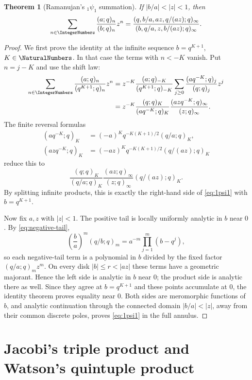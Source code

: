 \documentclass[11pt,oneside]{article}
\newtheorem{theorem}{Theorem}[section]
\theoremstyle{definition}
\begin{document}
\begin{theorem}[Ramanujan's ${}_1\psi_1$ summation]\label{thm:1psi1}
If $|b/a|<|z|<1$, then
\begin{equation}\label{eq:1psi1}
 \sum_{n\in\IntegerNumbers}\frac{(a;q)_n}{(b;q)_n}z^n
 =\frac{(q,b/a,az,q/(az);q)_\infty}
 {(b,q/a,z,b/(az);q)_\infty}.
\end{equation}
\end{theorem}

\begin{proof}
We first prove the identity at the infinite sequence $b=q^{K+1}$, $K\in\NaturalNumbers$. In that case the terms with $n<-K$ vanish. Put $n=j-K$ and use the shift law:
\begin{align*}
 \sum_{n\in\IntegerNumbers}\frac{(a;q)_n}{(q^{K+1};q)_n}z^n
 &=z^{-K}\frac{(a;q)_{-K}}{(q^{K+1};q)_{-K}}
 \sum_{j\ge0}\frac{(aq^{-K};q)_j}{(q;q)_j}z^j\\
 &=z^{-K}\frac{(q;q)_K}{(aq^{-K};q)_K}
 \frac{(azq^{-K};q)_\infty}{(z;q)_\infty}.
\end{align*}
The finite reversal formulas
\begin{align*}
 (aq^{-K};q)_K&=(-a)^Kq^{-K(K+1)/2}(q/a;q)_K,\\
 (azq^{-K};q)_K&=(-az)^Kq^{-K(K+1)/2}(q/(az);q)_K
\end{align*}
reduce this to
\[
 \frac{(q;q)_K}{(q/a;q)_K}
 \frac{(az;q)_\infty}{(z;q)_\infty}(q/(az);q)_K.
\]
By splitting infinite products, this is exactly the right-hand side of \eqref{eq:1psi1} with $b=q^{K+1}$.

Now fix $a,z$ with $|z|<1$. The positive tail is locally uniformly analytic in $b$ near $0$. By \eqref{eq:negative-tail},
\[
 \left(\frac ba\right)^m(q/b;q)_m
 =a^{-m}\prod_{j=1}^{m}(b-q^j),
\]
so each negative-tail term is a polynomial in $b$ divided by the fixed factor $(q/a;q)_m z^m$. On every disk $|b|\le r<|az|$ these terms have a geometric majorant. Hence the left side is analytic in $b$ near $0$; the product side is analytic there as well. Since they agree at $b=q^{K+1}$ and these points accumulate at $0$, the identity theorem proves equality near $0$. Both sides are meromorphic functions of $b$, and analytic continuation through the connected domain $|b/a|<|z|$, away from their common discrete poles, proves \eqref{eq:1psi1} in the full annulus.
\end{proof}


\section{Jacobi's triple product and Watson's quintuple product}
\end{document}
